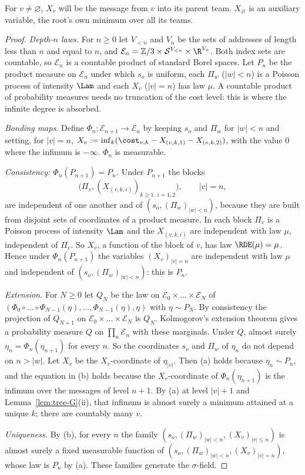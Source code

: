 For $v\ne\varnothing$, $X_v$ will be the message from $v$ into its parent team. $X_\varnothing$
is an auxiliary variable, the root's own minimum over all its teams.

\begin{proof}
\emph{Depth-$n$ laws.} For $n\ge0$ let $V_{<n}$ and $V_n$ be the sets of addresses of length
less than $n$ and equal to $n$, and
$\mathcal{E}_n=\mathbb{Z}/3\times\mathcal{S}^{V_{<n}}\times\R^{V_n}$. Both index sets are
countable, so $\mathcal{E}_n$ is a countable product of standard Borel spaces. Let $P_n$ be the
product measure on $\mathcal{E}_n$ under which $s_o$ is uniform, each $\Pi_w$ ($|w|<n$) is a
Poisson process of intensity $\Lam$ and each $X_v$ ($|v|=n$) has law $\mu$. A countable product
of probability measures needs no truncation of the cost level: this is where the infinite
degree is absorbed.

\emph{Bonding maps.} Define $\Phi_n:\mathcal{E}_{n+1}\to\mathcal{E}_n$ by keeping $s_o$ and
$\Pi_w$ for $|w|<n$ and setting, for $|v|=n$,
$X_v:=\inf_k(\cost_{v,k}-X_{(v,k,1)}-X_{(v,k,2)})$, with the value $0$ where the infimum is
$-\infty$. $\Phi_n$ is measurable.

\emph{Consistency: $\Phi_n(P_{n+1})=P_n$.} Under $P_{n+1}$ the blocks
\[
  \bigl(\Pi_v,(X_{(v,k,i)})_{k\ge1,\,i=1,2}\bigr),\qquad |v|=n,
\]
are independent of one another and of
$(s_o,(\Pi_w)_{|w|<n})$, because they are built from disjoint sets of coordinates of a product
measure. In each block $\Pi_v$ is a Poisson process of intensity $\Lam$ and the $X_{(v,k,i)}$
are independent with law $\mu$, independent of $\Pi_v$. So $X_v$, a function of the block of
$v$, has law $\RDE(\mu)=\mu$. Hence under $\Phi_n(P_{n+1})$ the variables $(X_v)_{|v|=n}$ are
independent with law $\mu$ and independent of $(s_o,(\Pi_w)_{|w|<n})$: this is $P_n$.

\emph{Extension.} For $N\ge0$ let $Q_N$ be the law on
$\mathcal{E}_0\times\dots\times\mathcal{E}_N$ of
$(\Phi_0\circ\dots\circ\Phi_{N-1}(\eta),\dots,\Phi_{N-1}(\eta),\eta)$ with $\eta\sim P_N$. By
consistency the projection of $Q_{N+1}$ on $\mathcal{E}_0\times\dots\times\mathcal{E}_N$ is
$Q_N$. Kolmogorov's extension theorem gives a probability measure $Q$ on
$\prod_n\mathcal{E}_n$ with these marginals. Under $Q$, almost surely
$\eta_n=\Phi_n(\eta_{n+1})$ for every $n$. So the coordinates $s_o$ and $\Pi_w$ of $\eta_n$ do
not depend on $n>|w|$. Let $X_v$ be the $X_v$-coordinate of $\eta_{|v|}$. Then (a) holds
because $\eta_n\sim P_n$, and the equation in (b) holds because the $X_v$-coordinate of
$\Phi_n(\eta_{n+1})$ is the infimum over the messages of level $n+1$. By (a) at level $|v|+1$
and Lemma~\ref{lem:tree-G}(ii), that infimum is almost surely a minimum attained at a unique
$k$; there are countably many $v$.

\emph{Uniqueness.} By (b), for every $n$ the family
$(s_o,(\Pi_w)_{|w|<n},(X_v)_{|v|\le n})$ is almost surely a fixed measurable function of
$(s_o,(\Pi_w)_{|w|<n},(X_v)_{|v|=n})$, whose law is $P_n$ by (a). These families generate the
$\sigma$-field.
\end{proof}

